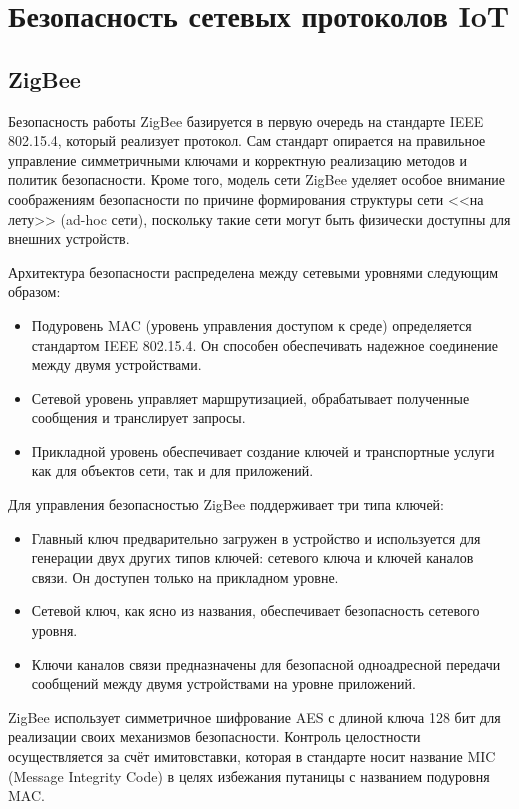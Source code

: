 \chapter{Безопасность сетевых протоколов IoT}

	\section{ZigBee}
	Безопасность работы ZigBee базируется в первую очередь на стандарте IEEE 802.15.4, который реализует
	протокол. Сам стандарт опирается на правильное управление симметричными ключами и корректную 
	реализацию методов и политик безопасности. Кроме того, модель сети ZigBee уделяет особое внимание 
	соображениям безопасности по причине формирования структуры сети <<на лету>> (ad-hoc сети), 
	поскольку такие сети могут быть физически доступны для внешних устройств.
	
	Архитектура безопасности распределена между сетевыми уровнями следующим образом:
	\begin{itemize}
		\item Подуровень MAC (уровень управления доступом к среде) определяется стандартом IEEE 802.15.4.
		Он способен обеспечивать надежное соединение между двумя устройствами.
		\item Сетевой уровень управляет маршрутизацией, обрабатывает полученные сообщения и транслирует
		запросы.
		\item Прикладной уровень обеспечивает создание ключей и транспортные услуги как для объектов
		сети, так и для приложений.
	\end{itemize}

	Для управления безопасностью ZigBee поддерживает три типа ключей:
	\begin{itemize}
		\item Главный ключ предварительно загружен в устройство и используется для генерации двух
		других типов ключей: сетевого ключа и ключей каналов связи. Он доступен только на прикладном
		уровне.
		\item Сетевой ключ, как ясно из названия, обеспечивает безопасность сетевого уровня.
		\item Ключи каналов связи предназначены для безопасной одноадресной передачи сообщений 
		между двумя устройствами на уровне приложений.
	\end{itemize}

	ZigBee использует симметричное шифрование AES с длиной ключа 128 бит для реализации своих механизмов 
	безопасности. Контроль целостности осуществляется за счёт имитовставки, которая в стандарте носит название MIC
	(Message Integrity Code) в целях избежания путаницы с названием подуровня MAC.

